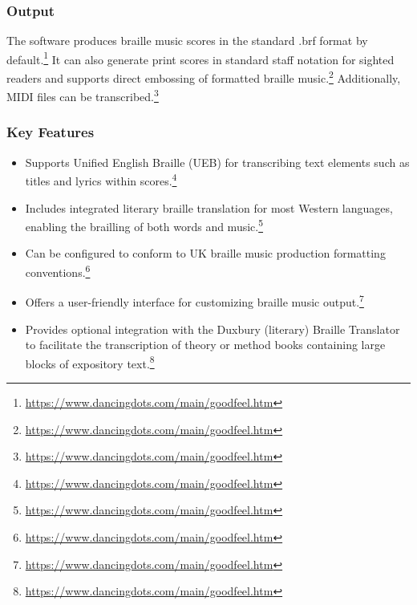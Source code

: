 \subsubsection{Output}
The software produces braille music scores in the standard .brf format by default.\footnote{\url{https://www.dancingdots.com/main/goodfeel.htm}} It can also generate print scores in standard staff notation for sighted readers and supports direct embossing of formatted braille music.\footnote{\url{https://www.dancingdots.com/main/goodfeel.htm}} Additionally, MIDI files can be transcribed.\footnote{\url{https://www.dancingdots.com/main/goodfeel.htm}}

\subsubsection{Key Features}
\begin{itemize}[noitemsep,topsep=0pt]
    \item Supports Unified English Braille (UEB) for transcribing text elements such as titles and lyrics within scores.\footnote{\url{https://www.dancingdots.com/main/goodfeel.htm}}
    \item Includes integrated literary braille translation for most Western languages, enabling the brailling of both words and music.\footnote{\url{https://www.dancingdots.com/main/goodfeel.htm}}
    \item Can be configured to conform to UK braille music production formatting conventions.\footnote{\url{https://www.dancingdots.com/main/goodfeel.htm}}
    \item Offers a user-friendly interface for customizing braille music output.\footnote{\url{https://www.dancingdots.com/main/goodfeel.htm}}
    \item Provides optional integration with the Duxbury (literary) Braille Translator to facilitate the transcription of theory or method books containing large blocks of expository text.\footnote{\url{https://www.dancingdots.com/main/goodfeel.htm}}
\end{itemize}

